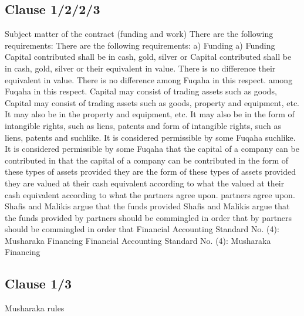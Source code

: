 \documentclass{article}%
\begin{document}
\subsection{Clause 1/2/2/3}%
\label{subsec:Clause1/2/2/3}%
Subject matter of the contract (funding and work)   There are the following requirements:   There are the following requirements: a) Funding a) Funding   Capital contributed shall be in cash, gold, silver or    Capital contributed shall be in cash, gold, silver or  their equivalent in value. There is no difference   their equivalent in value. There is no difference   among Fuqaha in this respect. among Fuqaha in this respect.   Capital may consist of trading assets such as goods,    Capital may consist of trading assets such as goods,  property and equipment, etc. It may also be in the  property and equipment, etc. It may also be in the  form of intangible rights, such as liens, patents and  form of intangible rights, such as liens, patents and  suchlike. It is considered permissible by some Fuqaha  suchlike. It is considered permissible by some Fuqaha  that the capital of a company can be contributed in  that the capital of a company can be contributed in  the form of these types of assets provided they are  the form of these types of assets provided they are  valued at their cash equivalent according to what the  valued at their cash equivalent according to what the  partners agree upon. partners agree upon.   Shafis and Malikis argue that the funds provided    Shafis and Malikis argue that the funds provided  by partners should be commingled in order that  by partners should be commingled in order that  Financial Accounting Standard No. (4): Musharaka Financing Financial Accounting Standard No. (4): Musharaka Financing

%
\subsection{Clause 1/3}%
\label{subsec:Clause1/3}%
Musharaka rules

%
\end{document}
